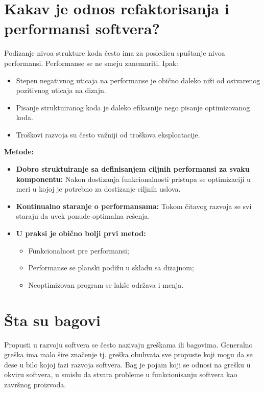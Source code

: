 \documentclass[a4paper]{article}
\begin{document}
\section{Kakav je odnos refaktorisanja i performansi softvera?}
  Podizanje nivoa strukture koda često ima za posledicu spuštanje nivoa performansi. Performanse
  se ne smeju zanemariti. Ipak:
  \begin{itemize}
    \item Stepen negativnog uticaja na performanse je obično daleko niži od ostvarenog pozitivnog
          uticaja na dizajn.
    \item Pisanje struktuiranog koda je daleko efikasnije nego pisanje optimizovanog koda.
    \item Troškovi razvoja su često važniji od troškova eksploatacije.
  \end{itemize}
  \textbf{Metode:}
  \begin{itemize}
    \item \textbf{Dobro struktuiranje sa definisanjem ciljnih performansi za svaku komponentu:}
          Nakon dostizanja funkcionalnosti pristupa se optimizaciji u meri u kojoj je 
          potrebno za dostizanje ciljnih uslova.
    \item \textbf{Kontinualno staranje o performansama:} Tokom čitavog razvoja se svi staraju da 
          uvek ponude optimalna rešenja.
    \item \textbf{U praksi je obično bolji prvi metod:}
          \begin{itemize}
            \item Funkcionalnost pre performansi;
            \item Performanse se planski podižu u skladu sa dizajnom;
            \item Neoptimizovan program se lakše održava i menja.
          \end{itemize}
  \end{itemize}

\section{Šta su bagovi}
  Propusti u razvoju softvera se često nazivaju greškama ili bagovima. Generalno greška ima malo šire
  značenje tj. greška obuhvata sve propuste koji mogu da se dese u bilo kojoj fazi razvoja softvera.
  Bag je pojam koji se odnosi na grešku u okviru softvera, u smislu da stvara probleme u
  funkcionisanju softvera kao završnog proizvoda. 
\end{document}
